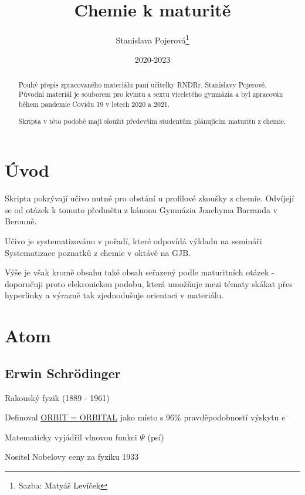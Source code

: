 \documentclass{article}
\title{Chemie k maturitě}
\author{Stanislava Pojerová\thanks{Sazba: Matyáš Levíček}}
\date{2020-2023}
\begin{document}
    \maketitle

    \begin{abstract}
        Pouhý přepis zpracovaného materiálu paní učitelky RNDRr. Stanislavy Pojerové. Původní materiál je souborem pro kvintu a sextu víceletého gymnázia a byl zpracován během pandemie Covidu 19 v letech 2020 a 2021.
        
        Skripta v této podobě mají sloužit především studentům plánujícím maturitu z chemie. 
    \end{abstract}

    \newpage
    \renewcommand{\contentsname}{Obsah podle tématu}
    \tableofcontents
    \newpage
    
    \section{Úvod}
        Skripta pokrývají učivo nutné pro obstání u profilové zkoušky z chemie. Odvíjejí se od otázek k tomuto předmětu z kánonu Gymnázia Joachyma Barranda v Berouně.

        Učivo je systematizováno v pořadí, které odpovídá výkladu na semináři Systematizace poznatků z chemie v oktávě na GJB. 

        Výše je však kromě obsahu také obsah seřazený podle maturitních otázek - doporučuji proto elekronickou podobu, která umožňuje mezi tématy skákat přes hyperlinky a výrazně tak zjednodušuje orientaci v materiálu.
    \newpage
    
\setlength{\parindent}{0px}
\section{Atom}
\subsection{Erwin Schrödinger}
Rakouský fyzik (1889 - 1961)

Definoval \underline{ORBIT = ORBITAL} jako místo s 96\% pravděpodobností výskytu $e^-$

Matematicky vyjádřil vlnovou funkci $\Psi$ (psí)

Nositel Nobelovy ceny za fyziku 1933

\TabPositions{0em, 12em, 25em}
\end{document}
